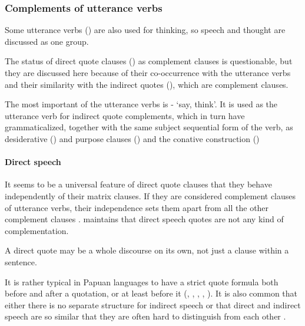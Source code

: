 \subsubsection{Complements of utterance verbs} \label{sec:8.3.2.1}

Some utterance verbs () are also used for thinking, so speech and thought are discussed as one group. 

The status of direct quote clauses () as complement clauses is questionable, but they are discussed here because of their co-occurrence with the utterance verbs and their similarity with the indirect quotes (), which are complement clauses.  

The most important of the utterance verbs is - `say, think'. It is used as the utterance verb for indirect quote complements, which in turn have grammaticalized, together with the same subject sequential form of the verb, as desiderative () and purpose clauses () and the conative construction () 

\paragraph[Direct speech]{Direct speech} \label{sec:8.3.2.1.1}

It seems to be a universal feature of direct quote clauses that they behave independently of their matrix clauses. If they are considered complement clauses of utterance verbs, their independence sets them apart from all the other complement clauses \citep[303]{Munro1982}. \citet[398]{Dixon2010} maintains that direct speech quotes are not any kind of complementation.

A direct quote may be a whole discourse on its own, not just a clause within a sentence.

It is rather typical in Papuan languages to have a strict quote formula both before and after a quotation, or at least before it (\citealt[120]{Franklin1971}, \citealt[1]{Davies1981}, \citealt[12]{Roberts1987}, \citealt{Farr1999}, \citealt[128]{Hepner2002}). It is also common that either there is no separate structure for indirect speech \citep[2]{Davies1981} or that direct and indirect speech are so similar that they are often hard to distinguish from each other \citep[14]{Roberts1987}. 

